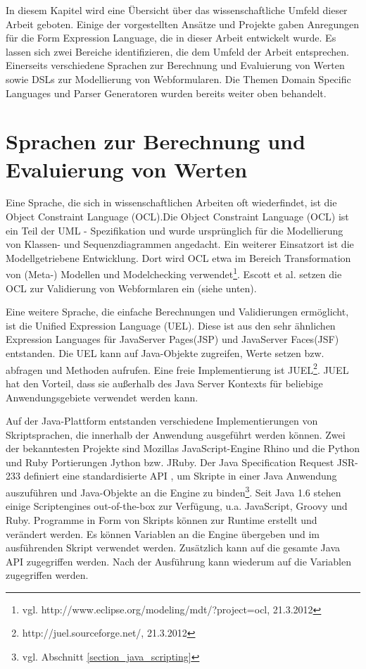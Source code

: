 In diesem Kapitel wird eine Über\-sicht über das wissenschaftliche Umfeld dieser Arbeit geboten. Einige der vorgestellten Ansätze und Projekte gaben Anregungen für die Form Expression Language, die in dieser Arbeit entwickelt wurde. Es lassen sich zwei Bereiche identifizieren, die dem Umfeld der Arbeit entsprechen. Einerseits verschiedene Sprachen zur Berechnung und Eva\-lu\-ier\-ung von Werten sowie DSLs zur Modellierung von Webformularen. Die Themen Domain Specific Languages und Parser Generatoren wurden bereits weiter oben behandelt.

\section{Sprachen zur Berechnung und Eva\-lu\-ier\-ung von Werten}

Eine Sprache, die sich in wissenschaftlichen Arbeiten oft wiederfindet, ist die Object Constraint Language (OCL)\cite{RiGo98}.Die Object Constraint Language (OCL) ist ein Teil der UML - Spezifikation und wurde ursprünglich für die Modellierung von Klassen- und Sequenzdiagrammen angedacht. Ein weiterer Einsatzort ist die Modellgetriebene Entwicklung. Dort wird OCL etwa im Bereich Transformation von (Meta-) Modellen und Modelchecking verwendet\footnote{vgl. http://www.eclipse.org/modeling/mdt/?project=ocl, 21.3.2012}. Escott et al.\cite{Esco12} setzen die OCL zur Validierung von Webformlaren ein (siehe unten).

Eine weitere Sprache, die einfache Berechnungen und Validierungen er\-mög\-licht, ist die Unified Expression Language (UEL). Diese ist aus den sehr ähnlichen Expression Languages für JavaServer Pages(JSP) und JavaServer Faces(JSF) entstanden. Die UEL kann auf Java-Objekte zugreifen, Werte setzen bzw. abfragen und Methoden aufrufen. Eine freie Implementierung ist JUEL\footnote{http://juel.sourceforge.net/, 21.3.2012}. JUEL hat den Vorteil, dass sie außerhalb des Java Server Kontexts für beliebige Anwendungsgebiete verwendet werden kann.

Auf der Java-Plattform entstanden verschiedene Implementierungen von Skriptsprachen, die innerhalb der Anwendung ausgeführt werden können. Zwei der bekanntesten Projekte sind Mozillas Java\-Script-Engine Rhino\cite{wwwRhino} und die Python und Ruby Portierungen Jython bzw. JRuby. Der Java Specification Request JSR-233 definiert eine standardisierte API \cite{JSR-223}, um Skripte in einer Java Anwendung auszuführen und Java-Objekte an die Engine zu binden\footnote{vgl. Abschnitt \ref{section_java_scripting}}.  Seit Java 1.6 stehen einige Scriptengines out-of-the-box zur Verfügung, u.a. Java\-Script, Groovy und Ruby. Programme in Form von Skripts können zur Runtime erstellt und verändert werden. Es können Variablen an die Engine übergeben und im ausführenden Skript verwendet werden. Zu\-sätz\-lich kann auf die gesamte Java API zugegriffen werden. Nach der Aus\-führ\-ung kann wiederum auf die Variablen zugegriffen werden. 

